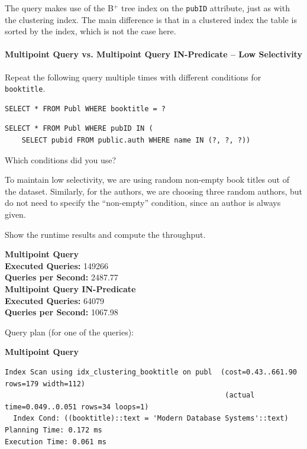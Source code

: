 \documentclass[11pt]{scrartcl}
\begin{document}
The query makes use of the B$^+$ tree index on the \texttt{pubID} attribute, just as with the clustering index.
The main difference is that in a clustered index the table is sorted by the index, which is not the case here.

\paragraph{Multipoint Query vs. Multipoint Query IN-Predicate -- Low Selectivity}

Repeat the following query multiple times with different conditions for \texttt{booktitle}.

\begin{lstlisting}[style=dbtsql]
SELECT * FROM Publ WHERE booktitle = ?
\end{lstlisting}

\begin{lstlisting}[style=dbtsql]
SELECT * FROM Publ WHERE pubID IN (
    SELECT pubid FROM public.auth WHERE name IN (?, ?, ?))
\end{lstlisting}


Which conditions did you use?

To maintain low selectivity, we are using random non-empty book titles out of the dataset.
Similarly, for the authors, we are choosing three random authors, but do not need to specify the \enquote{non-empty}
condition, since an author is always given.

Show the runtime results and compute the throughput.

\textbf{Multipoint Query}\\
\textbf{Executed Queries: } 149266\\
\textbf{Queries per Second: } 2487.77 \\

\textbf{Multipoint Query IN-Predicate}\\
\textbf{Executed Queries: } 64079\\
\textbf{Queries per Second: } 1067.98

Query plan (for one of the queries):

\textbf{Multipoint Query}
{\small
\parskip0pt\begin{verbatim}
Index Scan using idx_clustering_booktitle on publ  (cost=0.43..661.90 rows=179 width=112)
                                                    (actual time=0.049..0.051 rows=34 loops=1)
  Index Cond: ((booktitle)::text = 'Modern Database Systems'::text)
Planning Time: 0.172 ms
Execution Time: 0.061 ms
\end{verbatim}}
\end{document}
